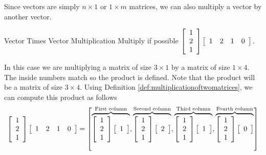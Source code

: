 Since vectors are simply $ n \times 1$ or $1 \times m$
matrices, we can also multiply a vector by another vector. 

\begin{example}{Vector Times Vector Multiplication}\label{exa:vectormultiplication}
Multiply if possible $\left[
\begin{array}{r}
1 \\
2 \\
1
\end{array}
\right] \left[
\begin{array}{rrrr}
1 & 2 & 1 & 0
\end{array}
\right] .$
\end{example}

\begin{solution} In this case we are multiplying a matrix of size $3 \times 1$ by a matrix of size $1 \times
4.$ The inside numbers match so the product is defined. Note that the product will be a matrix of size $3 \times 4$. 
Using Definition \ref{def:multiplicationoftwomatrices}, we can compute this product as follows $\:$
\begin{equation*}
\left[
\begin{array}{r}
1 \\
2 \\
1
\end{array}
\right] \left[
\begin{array}{rrrr}
1 & 2 & 1 & 0
\end{array}
\right] = 
\left[ \overset{
\text{First column}}{\overbrace{\left[
\begin{array}{r}
1 \\
2 \\
1
\end{array}
\right] \left[
\begin{array}{r}
1
\end{array}
\right] }},\overset{\text{Second column}}{\overbrace{\left[
\begin{array}{r}
1 \\
2\\
1
\end{array}
\right] \left[
\begin{array}{r}
2 
\end{array}
\right] }},\overset{\text{Third column}}{\overbrace{\left[
\begin{array}{r}
1 \\
2 \\
1
\end{array}
\right] \left[
\begin{array}{r}
1
\end{array}
\right] }}, \overset {\text{Fourth column}}{\overbrace{\left[
\begin{array}{r}
1\\
2\\
1
\end{array}
\right] \left[
\begin{array}{r}
0
\end{array}
\right]}}
\right]
\end{equation*}


\end{solution}
